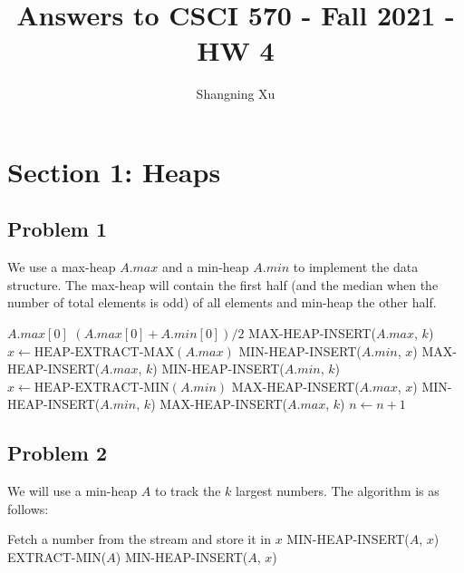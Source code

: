 \documentclass{article}
\title{Answers to CSCI 570 - Fall 2021 - HW 4}
\author{Shangning Xu}
\begin{document}
\maketitle

\section*{Section 1: Heaps}

\subsection*{Problem 1}

We use a max-heap $A.max$ and a min-heap $A.min$ to implement the data structure. The max-heap will contain the first half (and the median when the number of total elements is odd) of all elements and min-heap the other half.

\begin{algorithmic}[1]
            \State \Return $A.max[0]$
        \Else
            \State \Return $(A.max[0] + A.min[0])/2$
        \EndIf
    \EndFunction
            \State MAX-HEAP-INSERT($A.max$, $k$)
                \State $x \gets \textrm{HEAP-EXTRACT-MAX}(A.max)$
                \State MIN-HEAP-INSERT($A.min$, $x$)
                \State MAX-HEAP-INSERT($A.max$, $k$)
            \Else
                \State MIN-HEAP-INSERT($A.min$, $k$)
            \EndIf
            \State $x \gets \textrm{HEAP-EXTRACT-MIN}(A.min)$
            \State MAX-HEAP-INSERT($A.max$, $x$)
            \State MIN-HEAP-INSERT($A.min$, $k$)
        \Else
            \State MAX-HEAP-INSERT($A.max$, $k$)
        \EndIf
        \State $n \gets n + 1$
    \EndFunction
\end{algorithmic}

\subsection*{Problem 2}

We will use a min-heap $A$ to track the $k$ largest numbers. The algorithm is as follows:
\begin{algorithmic}[1]
        \State Fetch a number from the stream and store it in $x$
            \State MIN-HEAP-INSERT($A$, $x$)
            \State EXTRACT-MIN($A$)
            \State MIN-HEAP-INSERT($A$, $x$)
        \EndIf
    \EndWhile
\end{algorithmic}
\end{document}
